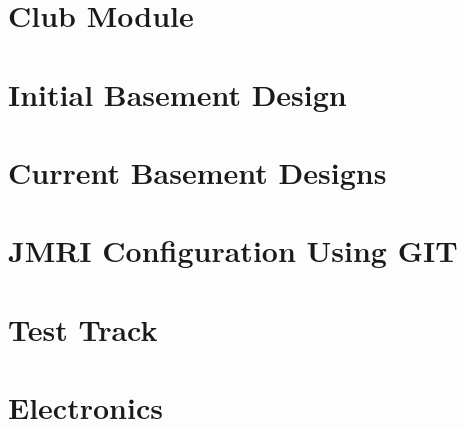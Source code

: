 \documentclass[12pt,twoside]{book}
\begin{document}
\frontmatter
\pagestyle{empty}

\pagestyle{protocol}
\dominitoc
\tableofcontents
\listoftables
\listoffigures

\mainmatter

\part{Club Module}



\part{Initial Basement Design}


\part{Current Basement Designs}


\part{JMRI Configuration Using GIT}


\part{Test Track}


\part{Electronics}




\backmatter
{}
\footnotesize
\printindex
\normalsize
{}
\end{document}
